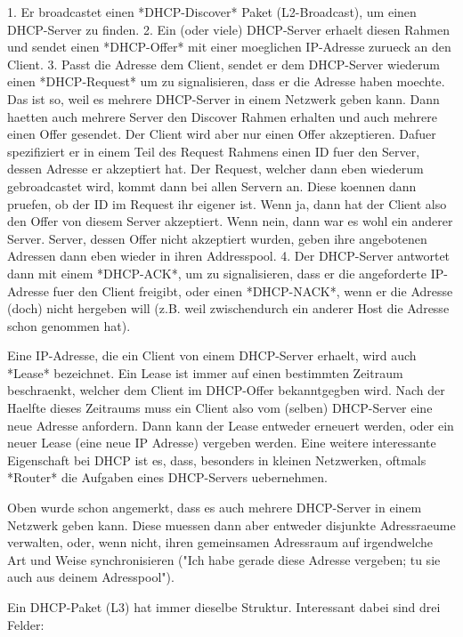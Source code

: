 1. Er broadcastet einen *DHCP-Discover* Paket (L2-Broadcast), um einen
   DHCP-Server zu finden.
2. Ein (oder viele) DHCP-Server erhaelt diesen Rahmen und sendet einen
   *DHCP-Offer* mit einer moeglichen IP-Adresse zurueck an den Client.
3. Passt die Adresse dem Client, sendet er dem DHCP-Server wiederum einen
   *DHCP-Request* um zu signalisieren, dass er die Adresse haben moechte. Das
   ist so, weil es mehrere DHCP-Server in einem Netzwerk geben kann. Dann
   haetten auch mehrere Server den Discover Rahmen erhalten und auch mehrere
   einen Offer gesendet. Der Client wird aber nur einen Offer
   akzeptieren. Dafuer spezifiziert er in einem Teil des Request Rahmens einen
   ID fuer den Server, dessen Adresse er akzeptiert hat. Der Request, welcher
   dann eben wiederum gebroadcastet wird, kommt dann bei allen Servern an. Diese
   koennen dann pruefen, ob der ID im Request ihr eigener ist. Wenn ja, dann hat
   der Client also den Offer von diesem Server akzeptiert. Wenn nein, dann war
   es wohl ein anderer Server. Server, dessen Offer nicht akzeptiert wurden,
   geben ihre angebotenen Adressen dann eben wieder in ihren Addresspool.
4. Der DHCP-Server antwortet dann mit einem *DHCP-ACK*, um zu signalisieren,
   dass er die angeforderte IP-Adresse fuer den Client freigibt, oder einen
   *DHCP-NACK*, wenn er die Adresse (doch) nicht hergeben will (z.B. weil
   zwischendurch ein anderer Host die Adresse schon genommen hat).

Eine IP-Adresse, die ein Client von einem DHCP-Server erhaelt, wird auch *Lease*
bezeichnet. Ein Lease ist immer auf einen bestimmten Zeitraum beschraenkt,
welcher dem Client im DHCP-Offer bekanntgegben wird. Nach der Haelfte dieses
Zeitraums muss ein Client also vom (selben) DHCP-Server eine neue Adresse
anfordern. Dann kann der Lease entweder erneuert werden, oder ein neuer Lease
(eine neue IP Adresse) vergeben werden. Eine weitere interessante Eigenschaft
bei DHCP ist es, dass, besonders in kleinen Netzwerken, oftmals *Router* die
Aufgaben eines DHCP-Servers uebernehmen.

Oben wurde schon angemerkt, dass es auch mehrere DHCP-Server in einem Netzwerk
geben kann. Diese muessen dann aber entweder disjunkte Adressraeume verwalten,
oder, wenn nicht, ihren gemeinsamen Adressraum auf irgendwelche Art und Weise
synchronisieren ("Ich habe gerade diese Adresse vergeben; tu sie auch aus deinem
Adresspool").

Ein DHCP-Paket (L3) hat immer dieselbe Struktur. Interessant dabei sind drei
Felder:

